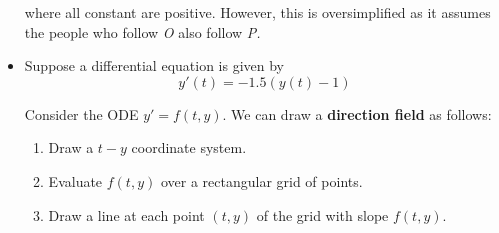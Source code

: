 \begin{itemize}
\begin{example}
              where all constant are positive. However, this is oversimplified as it assumes the people who follow \textit{O} also follow \textit{P.}
          \end{example}
    \item Suppose a differential equation is given by
          \begin{equation}
              y'(t) = -1.5(y(t)-1)
          \end{equation}
          \begin{definition}
              Consider the ODE $y'=f(t,y)$. We can draw a \textbf{direction field} as follows:
              \begin{enumerate}
                  \item Draw a $t-y$ coordinate system.
                  \item Evaluate $f(t,y)$ over a rectangular grid of points.
                  \item Draw a line at each point $(t,y)$ of the grid with slope $f(t,y)$.
              \end{enumerate}
          \end{definition}
          \begin{center}
\end{center}
\end{itemize}
